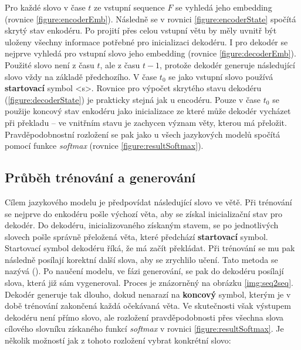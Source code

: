 Pro každé slovo v čase $t$ ze vstupní sequence $F$ se vyhledá jeho embedding (rovnice \ref{figure:encoderEmb}). Následně se v rovnici \ref{figure:encoderState} spočítá skrytý stav enkodéru. Po projití přes celou vstupní větu by měly uvnitř být uloženy všechny informace potřebné pro inicializaci dekodéru. I pro dekodér se nejprve vyhledá pro vstupní slovo jeho embedding (rovnice \ref{figure:decoderEmb}). Použité slovo není z času $t$, ale z času $t-1$, protože dekodér generuje následující slovo vždy na základě předchozího. V čase $t_0$ se jako vstupní slovo používá \textbf{startovací} symbol <s>. Rovnice pro výpočet skrytého stavu dekodéru (\ref{figure:decoderState}) je prakticky stejná jak u encodéru. Pouze v čase $t_0$ se použije koncový stav enkodéru jako inicializace ze které může dekodér vycházet při překladu -- ve vnitřním stavu je zachycen význam věty, kterou má přeložit. Pravděpodobnostní rozložení se pak jako u všech jazykových modelů spočítá pomocí funkce \emph{softmax} (rovnice \ref{figure:resultSoftmax}).


\subsection{Průběh trénování a generování}

Cílem jazykového modelu je předpovídat následující slovo ve větě. Při trénování se nejprve do enkodéru pošle výchozí věta, aby se získal inicializační stav pro dekodér. Do dekodéru, inicializovaného získaným stavem, se po jednotlivých slovech pošle správně přeložená věta, které předchází \textbf{startovací} symbol. Startovací symbol dekodéru říká, že má začít překládat. Při trénování se mu pak následně posílají korektní další slova, aby se zrychlilo učení. Tato metoda se nazývá  (\cite{teacherForcing}). Po naučení modelu, ve fázi generování, se pak do dekodéru posílají slova, která již sám vygeneroval. Proces je znázorněný na obrázku \ref{img:seq2seq}. Dekodér generuje tak dlouho, dokud nenarazí na \textbf{koncový} symbol, kterým je v době trénování zakončená každá očekávaná věta. Ve skutečnosti však výstupem dekodéru není přímo slovo, ale rozložení pravděpodobnosti přes všechna slova cílového slovníku získaného funkcí \emph{softmax} v rovnici \ref{figure:resultSoftmax}. Je několik možností jak z tohoto rozložení vybrat konkrétní slovo:

